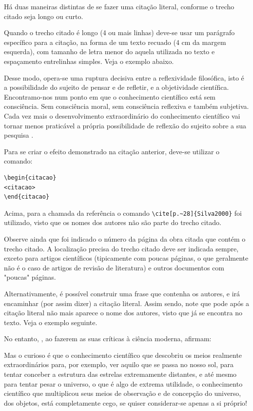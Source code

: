 \begin{apendicesenv}
Há duas maneiras distintas de se fazer uma citação literal, conforme o trecho citado seja longo ou curto.

Quando o trecho citado é longo (4 ou mais linhas) deve-se usar um parágrafo específico para a citação, na forma de um texto recuado (4 cm da margem esquerda), com tamanho de letra menor do aquela utilizada no texto e espaçamento entrelinhas simples. Veja o exemplo abaixo.

\begin{citacao}
	Desse modo, opera-se uma ruptura decisiva entre a reflexividade filosófica, isto é a possibilidade do sujeito de pensar e de refletir, e a objetividade científica. 	Encontramo-nos num ponto em que o conhecimento científico está sem consciência. Sem consciência moral, sem consciência reflexiva e também subjetiva. Cada vez mais o desenvolvimento extraordinário do conhecimento científico vai tornar menos praticável a própria possibilidade de reflexão do sujeito sobre a sua pesquisa \cite[p.~28]{Silva2000}.
\end{citacao}

Para se criar o efeito demonstrado na citação anterior, deve-se utilizar o comando:

\begin{verbatim}
\begin{citacao}
<citacao>
\end{citacao}
\end{verbatim}

Acima, para a chamada da referência o comando \verb|\cite[p.~28]{Silva2000}| foi utilizado, visto que os nomes dos autores não são parte do trecho citado.

Observe ainda que foi indicado o número da página da obra citada que contém o trecho citado. A localização precisa do trecho citado deve ser indicada sempre, exceto para artigos científicos (tipicamente com poucas páginas, o que geralmente não é o caso de artigos de revisão de literatura) e outros documentos com "poucas"{} páginas.

Alternativamente, é possível construir uma frase que contenha os autores, e irá encaminhar (por assim dizer) a citação literal. Assim sendo, note que pode após a citação literal não mais aparece o nome dos autores, visto que já se encontra no texto. Veja o exemplo seguinte.

No entanto, , ao fazerem as suas críticas à ciência moderna, afirmam:

\begin{citacao}
	Mas o curioso é que o conhecimento científico que descobriu os meios realmente extraordinários para, por exemplo, ver aquilo que se passa no nosso sol, para tentar conceber a estrutura das estrelas extremamente distantes, e até mesmo para tentar pesar o universo, o que é algo de extrema utilidade, o conhecimento científico que multiplicou seus meios de observação e de concepção do universo, dos objetos, está completamente cego, se quiser considerar-se apenas a si próprio!
\end{citacao}



\end{apendicesenv}
